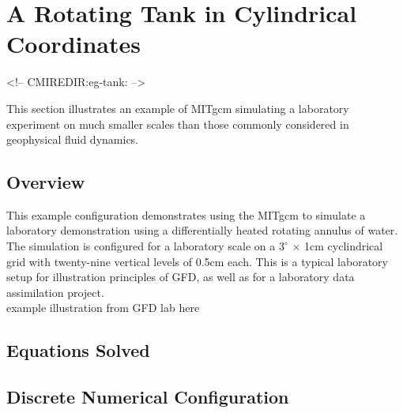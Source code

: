 

%
%

\section{A Rotating Tank in Cylindrical Coordinates}
\label{sect:eg-tank}
\label{www:tutorials}
\begin{rawhtml}
<!-- CMIREDIR:eg-tank: -->
\end{rawhtml}

This section illustrates an example of MITgcm simulating a laboratory
experiment on much smaller scales than those commonly considered in  
geophysical
fluid dynamics.

\subsection{Overview}
\label{www:tutorials}
                                                                          
This example configuration demonstrates using the MITgcm to simulate a
laboratory demonstration using a differentially heated rotating
annulus of water.  The simulation is configured for a laboratory scale
on a $3^{\circ}$ $\times$ 1cm cyclindrical grid with twenty-nine
vertical levels of 0.5cm each.  This is a typical laboratory setup for
illustration principles of GFD, as well as for a laboratory data
assimilation project.
\\

example illustration from GFD lab here
\\



 

\subsection{Equations Solved}
\label{www:tutorials}


\subsection{Discrete Numerical Configuration}
\label{www:tutorials}

